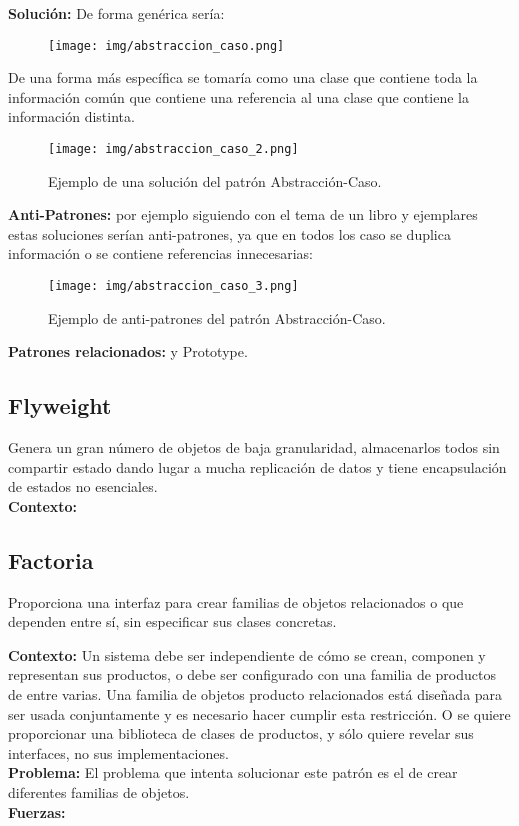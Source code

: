 \documentclass[10pt,a4paper,titlepage]{article}
\begin{document}
\textbf{Solución:} De forma genérica sería:
\begin{figure}[H] %
\centering
\texttt{[image: img/abstraccion\_caso.png]}
\end{figure}

De una forma más específica se tomaría como una clase que contiene toda la información común que contiene una referencia al una clase que contiene la información distinta.

\begin{figure}[H] %
\centering
\texttt{[image: img/abstraccion\_caso\_2.png]}
\caption{Ejemplo de una solución del patrón Abstracción-Caso.}
\end{figure}

\textbf{Anti-Patrones:} por ejemplo siguiendo con el tema de un libro y ejemplares estas soluciones serían anti-patrones, ya que en todos los caso se duplica información o se contiene referencias innecesarias:
\begin{figure}[H] %
\centering
\texttt{[image: img/abstraccion\_caso\_3.png]}
\caption{Ejemplo de anti-patrones del patrón Abstracción-Caso.}
\end{figure}

\textbf{Patrones relacionados:}  y Prototype.

\subsection{Flyweight}\label{Flyweight}
Genera un gran número de objetos de baja granularidad, almacenarlos todos sin compartir estado dando lugar a mucha replicación de datos y tiene encapsulación de estados no esenciales.\\

\textbf{Contexto:}

\subsection{Factoria}\label{Factoria}
Proporciona una interfaz para crear familias de objetos relacionados o que dependen entre sí, sin especificar sus clases concretas.

\textbf{Contexto: }Un sistema debe ser independiente de cómo se crean, componen y representan sus productos, o debe ser configurado con una familia de productos de entre varias. Una familia de objetos producto relacionados está diseñada para ser usada conjuntamente y es necesario hacer cumplir esta restricción. O se quiere proporcionar una biblioteca de clases de productos, y sólo quiere revelar sus interfaces, no sus implementaciones.\\

\textbf{Problema: }El problema que intenta solucionar este patrón es el de crear diferentes familias de objetos.\\

\textbf{Fuerzas: }
\end{document}
